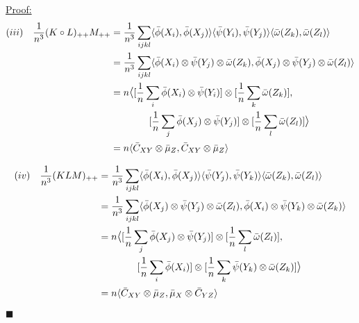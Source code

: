 \documentclass[12pt]{article}
\newenvironment{claimproof}[1]{\par\noindent\underline{Proof:}\space#1}{\hfill $\blacksquare$}
\numberwithin{claim}{section}
\numberwithin{lemma}{section}
\numberwithin{theorem}{section}
\begin{document}
\begin{claimproof}
\begin{align*}
(iii) && \frac{1}{n^3}(K\circ L)_{++}M_{++} &= \frac{1}{n^3} \sum_{ijkl} \langle \bar{\phi}(X_i),\bar{\phi}(X_j) \rangle  \langle \bar{\psi}(Y_i),\bar{\psi}(Y_j) \rangle  \langle \bar{\omega}(Z_k),\bar{\omega}(Z_l) \rangle\\
&&& =\frac{1}{n^3} \sum_{ijkl} \langle \bar{\phi}(X_i)\otimes\bar{\psi}(Y_j) \otimes  \bar{\omega}(Z_k),\bar{\phi}(X_j)\otimes \bar{\psi}(Y_j) \otimes \bar{\omega}(Z_l) \rangle\\
&&& = n  \mathlarger{\langle} [\frac{1}{n} \sum_{i}\bar{\phi}(X_i)\otimes\bar{\psi}(Y_i)] \otimes [\frac{1}{n} \sum_k \bar{\omega}(Z_k)],\\&&&\quad\quad\quad\quad[\frac{1}{n}\sum_{j}\bar{\phi}(X_j)\otimes \bar{\psi}(Y_j)] \otimes [\frac{1}{n} \sum_l \bar{\omega}(Z_l)]\mathlarger{\rangle}\\
&&& = n\langle \bar{C}_{XY}\otimes \bar{\mu}_Z,\bar{C}_{XY}\otimes \bar{\mu}_Z \rangle\\
\end{align*}

\begin{align*}
(iv) && \frac{1}{n^3}(KLM)_{++} &= \frac{1}{n^3} \sum_{ijkl} \langle \bar{\phi}(X_i),\bar{\phi}(X_j) \rangle  \langle \bar{\psi}(Y_j),\bar{\psi}(Y_k) \rangle  \langle \bar{\omega}(Z_k),\bar{\omega}(Z_l) \rangle\\
&&& =\frac{1}{n^3} \sum_{ijkl} \langle \bar{\phi}(X_j)\otimes\bar{\psi}(Y_j) \otimes  \bar{\omega}(Z_l),\bar{\phi}(X_i)\otimes \bar{\psi}(Y_k) \otimes \bar{\omega}(Z_k) \rangle\\
&&& = n  \mathlarger{\langle} [\frac{1}{n} \sum_{j}\bar{\phi}(X_j)\otimes\bar{\psi}(Y_j)] \otimes [\frac{1}{n} \sum_l \bar{\omega}(Z_l)],\\&&&\quad\quad\quad\quad[\frac{1}{n}\sum_{i}\bar{\phi}(X_i)]\otimes  [\frac{1}{n} \sum_k \bar{\psi}(Y_k) \otimes \bar{\omega}(Z_k)]\mathlarger{\rangle}\\
&&& = n\langle \bar{C}_{XY}\otimes \bar{\mu}_Z,\bar{\mu}_X \otimes \bar{C}_{YZ} \rangle\\
\end{align*}


\end{claimproof}
\end{document}
